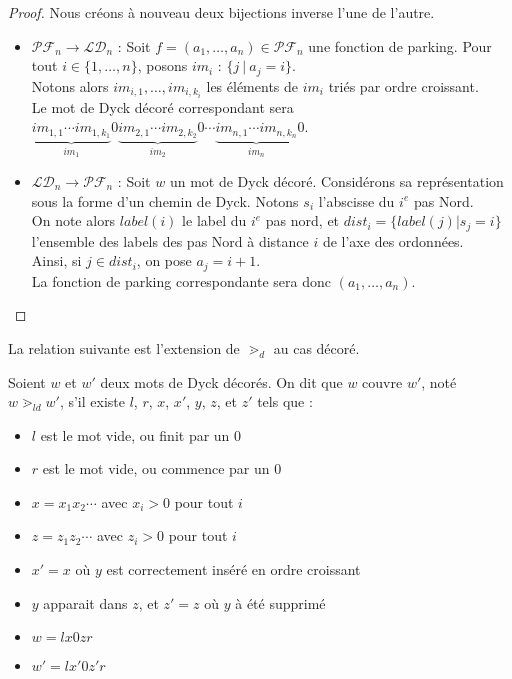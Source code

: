 \begin{proof}
    Nous créons à nouveau deux bijections inverse l'une de l'autre.
    \begin{itemize}
        \item $\mathcal{PF}_n \to \mathcal{LD}_n$ :
        Soit $f = (a_1, \ldots, a_n) \in \mathcal{PF}_n$ une fonction de
        parking. Pour tout $i \in \{1, \ldots, n\}$, posons $im_i$ :
        $\{j\ |\ a_j = i\}$. \\
        Notons alors $im_{i,1}, \ldots, im_{i,k_i}$ les éléments de $im_i$
        triés par ordre croissant.\\
        Le mot de Dyck décoré correspondant sera 
        $\underbrace{im_{1,1} \cdots im_{1,k_1}}_{im_1}0
         \underbrace{im_{2,1} \cdots im_{2,k_2}}_{im_2}0
         \cdots
         \underbrace{im_{n,1} \cdots im_{n,k_n}}_{im_n}0$.

        \item $\mathcal{LD}_n \to \mathcal{PF}_n$ :
        Soit $w$ un mot de Dyck décoré. Considérons sa représentation sous
        la forme d'un chemin de Dyck. Notons $s_i$ l'abscisse du $i^{e}$ pas
        Nord.\\
        On note alors $label(i)$ le label du $i^{e}$ pas nord, et
        $dist_i = \{label(j) | s_j = i\}$ l'ensemble  des labels des pas
        Nord à distance $i$ de l'axe des ordonnées.\\
        Ainsi, si $j \in dist_i$, on pose $a_j = i + 1$.\\
        La fonction de parking correspondante sera donc $(a_1, \ldots, a_n)$.
    \end{itemize}
\end{proof}

La relation suivante est l'extension de $\gtrdot_d$ au cas décoré.

\begin{definition}[$\gtrdot_{ld}$]
    Soient $w$ et $w'$ deux mots de Dyck décorés. On dit que $w$ couvre
    $w'$, noté $w \gtrdot_{ld} w'$, s'il existe $l$, $r$, $x$, $x'$, $y$,
    $z$, et $z'$ tels que :
    \begin{itemize}
        \item $l$ est le mot vide, ou finit par un $0$
        \item $r$ est le mot vide, ou commence par un $0$
        \item $x = x_1x_2 \cdots$ avec $x_i > 0$ pour tout $i$
        \item $z = z_1z_2 \cdots$ avec $z_i > 0$ pour tout $i$
        \item $x' = x$ où $y$ est correctement inséré en ordre croissant
        \item $y$ apparait dans $z$, et $z' = z$ où $y$ à été supprimé
        \item $w = lx0zr$
        \item $w' = lx'0z'r$
    \end{itemize}
\end{definition}

